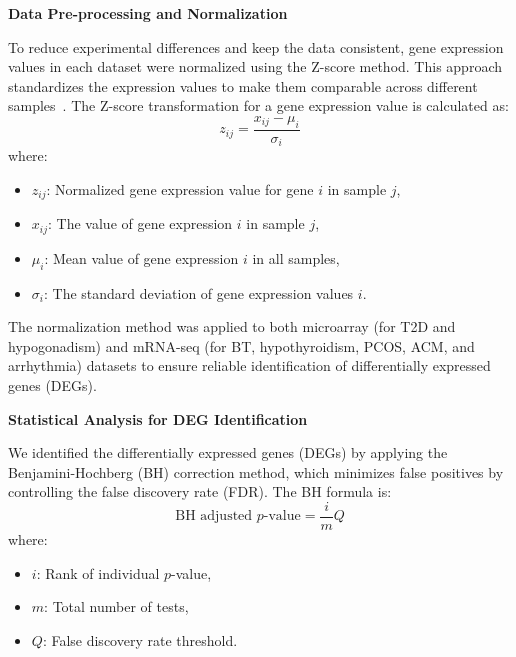 \vspace*{-\parskip} %
\textbf{Data Pre-processing and Normalization}
\vspace{7mm}

To reduce experimental differences and keep the data consistent, gene expression values in each dataset were normalized using the Z-score method. This approach standardizes the expression values to make them comparable across different samples~\cite{zscore_ref}. The Z-score transformation for a gene expression value is calculated as:
\begin{equation}
z_{ij} = \frac{x_{ij} - \mu_i}{\sigma_i}
\label{eq:zscore}
\end{equation}
where:
\begin{itemize}
    \item $z_{ij}$: Normalized gene expression value for gene $i$ in sample $j$,
    \item $x_{ij}$: The value of gene expression $i$ in sample $j$,
    \item $\mu_i$: Mean value of gene expression $i$ in all samples,
    \item $\sigma_i$: The standard deviation of gene expression values $i$.
\end{itemize}

The normalization method was applied to both microarray (for T2D and hypogonadism) and mRNA-seq (for BT, hypothyroidism, PCOS, ACM, and arrhythmia) datasets to ensure reliable identification of differentially expressed genes (DEGs).

\vspace{8mm}
\textbf{Statistical Analysis for DEG Identification}
\vspace{5mm}

We identified the differentially expressed genes (DEGs) by applying the Benjamini-Hochberg (BH) correction method, which minimizes false positives by controlling the false discovery rate (FDR). The BH formula is:
\begin{equation}
\text{BH adjusted } p\text{-value} = \frac{i}{m} Q
\label{eq:bh_formula}
\end{equation}
where:
\begin{itemize}
    \item $i$: Rank of individual $p$-value,
    \item $m$: Total number of tests,
    \item $Q$: False discovery rate threshold.
\end{itemize}

